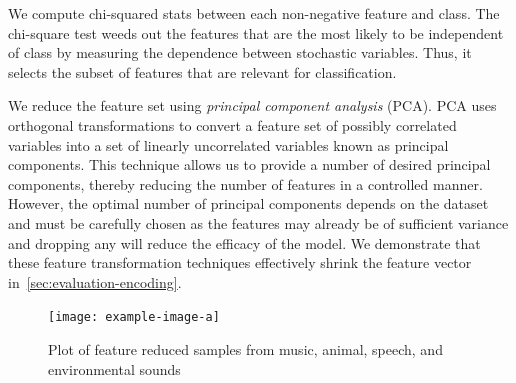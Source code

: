 %
We compute chi-squared stats between each non-negative feature and class.
% 
The chi-square test weeds out the features that are the most likely to be
independent of class by measuring the dependence between stochastic variables.
%
Thus, it selects the subset of features that are relevant for classification.

%
We reduce the feature set using \textit{principal component analysis} (PCA).
%
PCA uses orthogonal transformations to convert a feature set of 
possibly correlated variables into a set of linearly uncorrelated variables
known as principal components. 
%
This technique allows us to provide a number of desired principal components,
thereby reducing the number of features in a controlled manner. 
%
However, the optimal number of principal components depends on the dataset 
and must be carefully chosen as the features may already be of sufficient
variance and dropping any will reduce the efficacy of the model. 
%
%
We demonstrate that these feature transformation techniques effectively
shrink the feature vector in~\cref{sec:evaluation-encoding}.

\begin{figure}[t]
    \centering
    \texttt{[image: example-image-a]}
    \caption{Plot of feature reduced samples from music, animal, speech, and environmental sounds}
    \label{fig:top-dist}
\end{figure}

